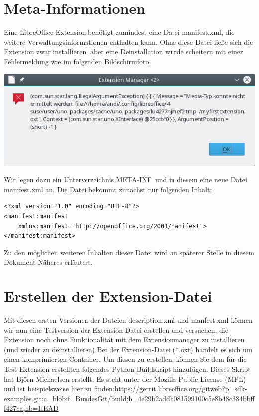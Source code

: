 \documentclass[a4paper,10pt,pagesize,titlepage]{scrbook}
\begin{document}
\section{Meta-Informationen}

Eine LibreOffice Extension benötigt zumindest eine Datei manifest.xml, die weitere Verwaltungsinformationen enthalten kann. Ohne diese Datei ließe sich die Extension zwar installieren, aber eine Deinstallation würde scheitern mit einer Fehlermeldung wie im folgenden Bildschirmfoto.
\begin{center}
	\captionsetup{type=figure}
\includegraphics[width=0.7\linewidth]{pics/error_deinstallation_missing_manifest}
\label{fig:error_deinstallation_missing_manifest}
\end{center}

Wir legen dazu ein Unterverzeichnis \glqq META-INF\grqq~und in diesem eine neue Datei manifest.xml an. Die Datei bekommt zunächst nur folgenden Inhalt:
\begin{lstlisting}
<?xml version="1.0" encoding="UTF-8"?>
<manifest:manifest 
    xmlns:manifest="http://openoffice.org/2001/manifest">
</manifest:manifest>
\end{lstlisting}

Zu den möglichen weiteren Inhalten dieser Datei wird an späterer Stelle  in diesem Dokument Näheres erläutert.



\section{Erstellen der Extension-Datei}

Mit diesen ersten Versionen der Dateien description.xml und manfest.xml können wir nun eine Testversion der Extension-Datei erstellen und versuchen, die Extension noch ohne Funktionalität mit dem Extensionmanager zu installieren (und wieder zu deinstallieren)
Bei der Extension-Datei (*.oxt) handelt es sich um einen komprimierten Container. Um diesen zu erstellen, können Sie dem für die Test-Extension erstellten folgendes Python-Buildskript hinzufügen. Dieses Skript hat Björn Michaelsen erstellt. Es steht unter der Mozilla Public License (MPL) und ist beispielsweise hier zu finden:\linebreak \url{https://gerrit.libreoffice.org/gitweb?p=sdk-examples.git;a=blob;f=BundesGit/build;h=4e29b2addb081599100c5e8b48c384bbfff427ca;hb=HEAD}
\end{document}
